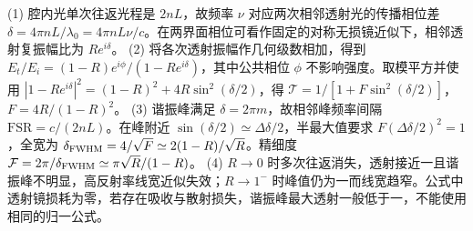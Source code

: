 (1) 腔内光单次往返光程是 \(2nL\)，故频率 \(\nu\) 对应两次相邻透射光的传播相位差 \(\delta=4\pi nL/\lambda_0=4\pi nL\nu/c\)。在两界面相位可看作固定的对称无损镜近似下，相邻透射复振幅比为 \(Re^{i\delta}\)。
(2) 将各次透射振幅作几何级数相加，得到 \(E_t/E_i=(1-R)e^{i\phi}/(1-Re^{i\delta})\)，其中公共相位 \(\phi\) 不影响强度。取模平方并使用 \(|1-Re^{i\delta}|^2=(1-R)^2+4R\sin^2(\delta/2)\)，得 \(\mathcal T=1/[1+F\sin^2(\delta/2)]\)，\(F=4R/(1-R)^2\)。
(3) 谐振峰满足 \(\delta=2\pi m\)，故相邻峰频率间隔 \(\mathrm{FSR}=c/(2nL)\)。在峰附近 \(\sin(\delta/2)\simeq\Delta\delta/2\)，半最大值要求 \(F(\Delta\delta/2)^2=1\)，全宽为 \(\delta_{\rm FWHM}=4/\sqrt F\simeq2(1-R)/\sqrt R\)。精细度 \(\mathcal F=2\pi/\delta_{\rm FWHM}\simeq\pi\sqrt R/(1-R)\)。
(4) \(R\to0\) 时多次往返消失，透射接近一且谐振峰不明显，高反射率线宽近似失效；\(R\to1^-\) 时峰值仍为一而线宽趋窄。公式中透射镜损耗为零，若存在吸收与散射损失，谐振峰最大透射一般低于一，不能使用相同的归一公式。
